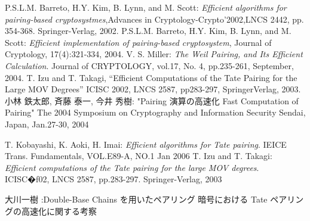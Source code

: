 \documentclass[a4j,oneside,openany]{jsbook}
\begin{document}
\begin{thebibliography}{99}
	 P.S.L.M. Barreto, H.Y. Kim, B. Lynn, and M. Scott: {\em Efficient algorithms for pairing-based cryptosystmes},Advances in Cryptology-Crypto'2002,LNCS 2442, pp. 354-368. Springer-Verlag, 2002.
	 P.S.L.M. Barreto, H.Y. Kim, B. Lynn, and M. Scott: {\em Efficient implementation of pairing-based cryptosystem}, Journal of Cryptology, 17(4):321-334, 2004.
	 V. S. Miller: {\em The Weil Pairing, and Its Efficient Calculation}. Journal of CRYPTOLOGY, vol.17, No. 4, pp.235-261, September, 2004.
   T. Izu and T. Takagi, “Efficient Computations of the Tate Pairing for the Large MOV Degrees” ICISC 2002, LNCS 2587, pp283-297, SpringerVerlag, 2003.
   小林 鉄太郎, 斉藤 泰一, 今井 秀樹: "Pairing 演算の高速化 Fast Computation of Pairing" The 2004 Symposium on Cryptography and Information Security Sendai, Japan, Jan.27-30, 2004

	 T. Kobayashi, K. Aoki, H. Imai: {\em Efficient algorithms for Tate pairing}. IEICE Trans. Fundamentals, VOL.E89-A, NO.1 Jan 2006
	 T. Izu and T. Takagi: {\em Efficient computations of the Tate pairing for the large MOV degrees}. ICISC�f02, LNCS 2587, pp.283-297. Springer-Verlag, 2003

大川一樹 :Double-Base Chains を用いたペアリング 暗号における Tate ペアリングの高速化に関する考察

\end{thebibliography}
\end{document}
